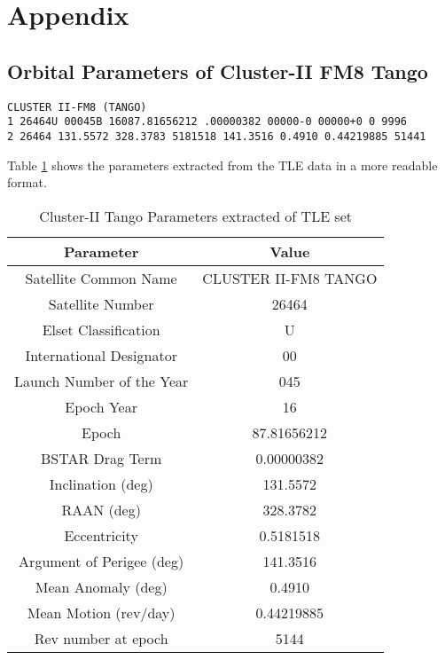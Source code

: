 \section*{Appendix}

\subsection*{Orbital Parameters of Cluster-II FM8 Tango}

\texttt{CLUSTER II-FM8 (TANGO)\\
1 26464U 00045B 16087.81656212 .00000382 00000-0 00000+0 0 9996\\
2 26464 131.5572 328.3783 5181518 141.3516 0.4910 0.44219885 51441}

\vspace{1em}
Table \ref{table:tle} shows the parameters extracted from the TLE data in a more readable format.

\begin{table}[h!]
\centering
\caption{Cluster-II Tango Parameters extracted of TLE set}
\label{table:tle}
\begin{tabular}{|c | c|} 
 \hline
 \textbf{Parameter} & \textbf{Value} \\ [0.5ex] 
 \hline
 Satellite Common Name &  CLUSTER II-FM8 TANGO\\ 
 Satellite Number &  26464\\
 Elset Classification &  U\\
 International Designator &  00\\
 Launch Number of the Year & 045\\
 Epoch Year & 16\\
 Epoch & 87.81656212\\
 BSTAR Drag Term &  0.00000382\\
 Inclination (deg) &  131.5572\\
 RAAN (deg) &  328.3782\\
 Eccentricity &  0.5181518\\
 Argument of Perigee (deg) &  141.3516\\
 Mean Anomaly (deg) &  0.4910\\
 Mean Motion (rev/day) &  0.44219885\\
 Rev number at epoch &  5144 \\ [1ex] 
 \hline
\end{tabular}
\end{table}
